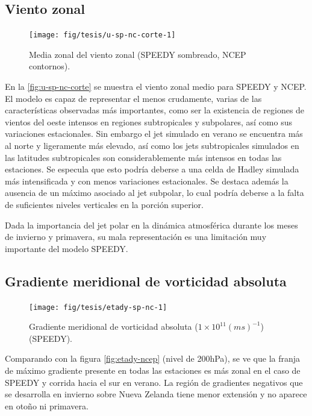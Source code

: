 \documentclass[spanish,a4paper,12pt,oneside]{book}
\begin{document}
\subsection{Viento zonal}\label{viento-zonal-1}

\begin{figure}
\texttt{[image: fig/tesis/u-sp-nc-corte-1]} \caption{Media zonal del viento zonal (SPEEDY sombreado, NCEP contornos).}\label{fig:u-sp-nc-corte}
\end{figure}

En la \autoref{fig:u-sp-nc-corte} se muestra el viento zonal medio para
SPEEDY y NCEP. El modelo es capaz de representar el menos crudamente,
varias de las características observadas más importantes, como ser la
existencia de regiones de vientos del oeste intensos en regiones
subtropicales y subpolares, así como sus variaciones estacionales. Sin
embargo el jet simulado en verano se encuentra más al norte y
ligeramente más elevado, así como los jets subtropicales simulados en
las latitudes subtropicales son considerablemente más intensos en todas
las estaciones. Se especula que esto podría deberse a una celda de
Hadley simulada más intensificada y con menos variaciones estacionales.
Se destaca además la ausencia de un máximo asociado al jet subpolar, lo
cual podría deberse a la falta de suficientes niveles verticales en la
porción superior.

Dada la importancia del jet polar en la dinámica atmosférica durante los
meses de invierno y primavera, su mala representación es una limitación
muy importante del modelo SPEEDY.

\subsection{Gradiente meridional de vorticidad
absoluta}\label{gradiente-meridional-de-vorticidad-absoluta}

\begin{landscape}\begin{figure}

{\centering \texttt{[image: fig/tesis/etady-sp-nc-1]} 

}

\caption{Gradiente meridional de vorticidad absoluta ($1\times10^11(ms)^{-1}$) (SPEEDY).}\label{fig:etady-sp-nc}
\end{figure}
\end{landscape}

Comparando con la figura \autoref{fig:etady-ncep} (nivel de 200hPa), se
ve que la franja de máximo gradiente presente en todas las estaciones es
más zonal en el caso de SPEEDY y corrida hacia el sur en verano. La
región de gradientes negativos que se desarrolla en invierno sobre Nueva
Zelanda tiene menor extensión y no aparece en otoño ni primavera.
\end{document}

